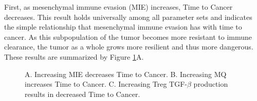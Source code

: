 \documentclass{article}
\begin{document}
First, as mesenchymal immune evasion (MIE) increases, Time to Cancer decreases.
This result holds universally among all parameter sets and indicates the simple relationship that mesenchymal immune evasion has with time to cancer.
As this subpopulation of the tumor becomes more resistant to immune clearance, the tumor as a whole grows more resilient and thus more dangerous.
These results are summarized by Figure \ref{fig:FirstSurvivalCurves}A.

\begin{figure}[H]
\center
{}
\caption{A. Increasing MIE decreases Time to Cancer. 
B. Increasing MQ increases Time to Cancer.
C. Increasing Treg TGF-$\beta$ production results in decreased Time to Cancer.
\newline
}
\label{fig:FirstSurvivalCurves}
\end{figure}
\end{document}
